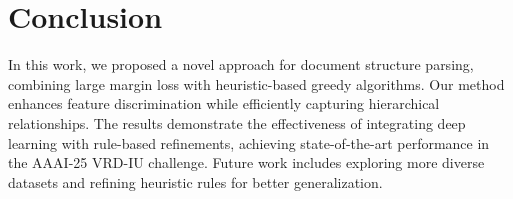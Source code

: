 \section{Conclusion}\label{sec:conclusion}
In this work, we proposed a novel approach for document structure parsing, combining large margin loss with heuristic-based greedy algorithms. Our method enhances feature discrimination while efficiently capturing hierarchical relationships. The results demonstrate the effectiveness of integrating deep learning with rule-based refinements, achieving state-of-the-art performance in the AAAI-25 VRD-IU challenge. Future work includes exploring more diverse datasets and refining heuristic rules for better generalization.  